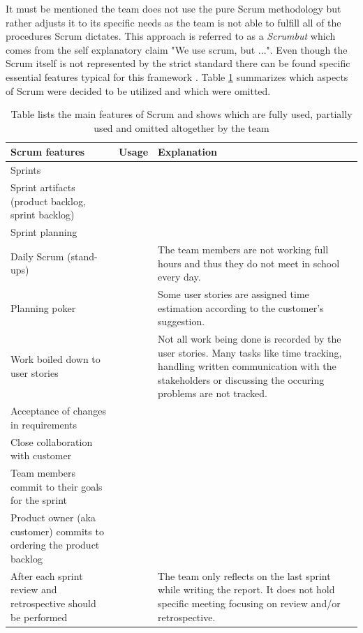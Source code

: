 It must be mentioned the team does not use the pure Scrum methodology but rather adjusts it to its specific needs as the team is not able to fulfill all of the procedures Scrum dictates. This approach is referred to as a \textit{Scrumbut} \cite{viscardi2013professional} which comes from the self explanatory claim "We use scrum, but ...". Even though the Scrum itself is not represented by the strict standard there can be found specific essential features typical for this framework \cite{TheScrumGuide} \cite[p. 15, p. 97, p. 154]{viscardi2013professional}. Table \ref{tab:scrumbut} summarizes which aspects of Scrum were decided to be utilized and which were omitted. 

\begin{table}[!h]
	\begin{center}
	\caption{Table lists the main features of Scrum and shows which are fully used, partially used and omitted altogether by the team}
	\label{tab:scrumbut}
	\def\arraystretch{1.3}
		\begin{tabularx}{0.9\textwidth}{ X c X }
		\toprule[0.5mm]
		\textbf{Scrum features} & \textbf{Usage} & \textbf{Explanation} \\
		\midrule
		Sprints 											& \tick			& 	 	\\
		Sprint artifacts (product backlog, sprint backlog)	& \tick			& 	 	\\
		Sprint planning 									& \tick			& 	 	\\
		Daily Scrum (stand-ups)								& \tickorange	& The team members are not working full hours and thus they do not meet in school every day. \\
		Planning poker 										& \tickorange 	& Some user stories are assigned time estimation according to the customer's suggestion.		\\
		Work boiled down to user stories 					& \tickorange   & Not all work being done is recorded by the user stories. Many tasks like time tracking, handling written communication with the stakeholders or discussing the occuring problems are not tracked. \\
		Acceptance of changes in requirements				& \tick 		& 		\\
		Close collaboration with customer					& \tick 		& 		\\
		Team members commit to their goals for the sprint	& \tick 		& 		\\
		Product owner (aka customer) commits to ordering the product backlog & \tick & \\
		After each sprint review and retrospective should be performed & \cross & The team only reflects on the last sprint while writing the report. It does not hold specific meeting focusing on review and/or retrospective. \\

\end{tabularx}
\end{center}
\end{table}
